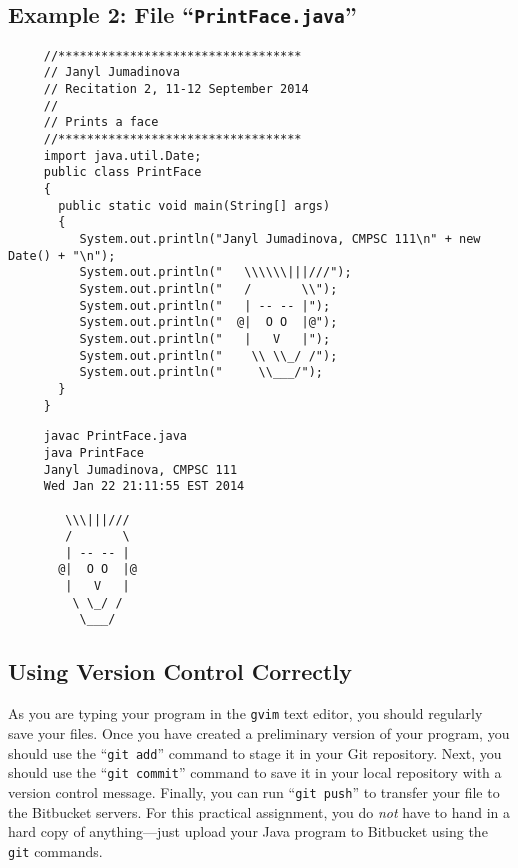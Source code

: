 \subsection*{Example 2: File ``{\tt PrintFace.java}''}
\begin{verbatim}
     //**********************************
     // Janyl Jumadinova
     // Recitation 2, 11-12 September 2014
     //
     // Prints a face
     //**********************************
     import java.util.Date;
     public class PrintFace
     {
       public static void main(String[] args)
       {
          System.out.println("Janyl Jumadinova, CMPSC 111\n" + new Date() + "\n");
          System.out.println("   \\\\\\|||///");
          System.out.println("   /       \\");
          System.out.println("   | -- -- |");
          System.out.println("  @|  O O  |@");
          System.out.println("   |   V   |");
          System.out.println("    \\ \\_/ /");
          System.out.println("     \\___/");
       }
     } 
\end{verbatim}
\begin{verbatim}
     javac PrintFace.java
     java PrintFace
     Janyl Jumadinova, CMPSC 111
     Wed Jan 22 21:11:55 EST 2014
     
        \\\|||///
        /       \
        | -- -- |
       @|  O O  |@
        |   V   |
         \ \_/ /
          \___/
\end{verbatim}

\subsection*{Using Version Control Correctly}

As you are typing your program in the {\tt gvim} text editor, you should regularly save your files.  Once you have
created a preliminary version of your program, you should use the ``{\tt git add}'' command to stage it in your Git
repository.  Next, you should use the ``{\tt git commit}'' command to save it in your local repository with a version
control message.  Finally, you can run ``{\tt git push}'' to transfer your file to the Bitbucket servers.  For this
practical assignment, you do {\em not} have to hand in a hard copy of anything---just upload your Java program to
Bitbucket using the {\tt git} commands. 

